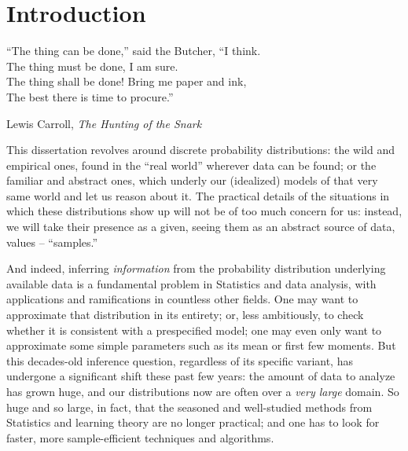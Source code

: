\chapter*{Introduction} %

\epigraph{``The thing can be done,'' said the Butcher, ``I think.\\
The thing must be done, I am sure.\\
The thing shall be done! Bring me paper and ink,\\
The best there is time to procure.''}{Lewis Carroll, \textit{The Hunting of the Snark}}


This dissertation revolves around discrete probability distributions: the wild and empirical ones, found in the ``real world''  wherever data can be found; or the familiar and abstract ones, which underly our (idealized) models of that very same world and let us reason about it. The practical details of the situations in which these distributions show up will not be of too much concern for us: instead, we will take their presence as a given, seeing them as an abstract source of data, values -- ``samples.''

And indeed, inferring \emph{information} from the probability distribution underlying available data is a fundamental problem in Statistics and data analysis, with applications and ramifications in countless other fields. One may want to approximate that distribution in its entirety; or, less ambitiously, to check whether it is consistent with a prespecified model; one may even only want to approximate some simple parameters such as its mean or first few moments. But this decades-old inference question, regardless of its specific variant, has undergone a significant shift these past few years: the amount of data to analyze has grown huge, and our distributions now are often over a \emph{very large} domain. So huge and so large, in fact, that the seasoned and well-studied methods from Statistics and learning theory are no longer practical; and one has to look for faster, more sample-efficient techniques and algorithms.

